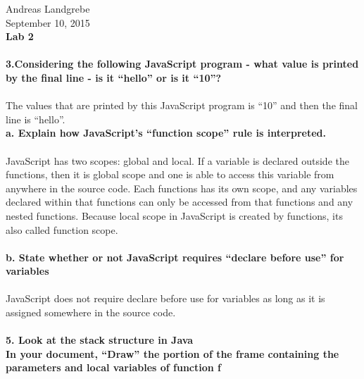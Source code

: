\documentclass{article}
\begin{document}
\noindent
Andreas Landgrebe
\\
September 10, 2015
\\
\textbf{Lab 2}
\\
\\
\textbf{3.Considering the following JavaScript program - what value is printed by the final line - is it ``hello'' or is it ``10''?}
\\
\\

The values that are printed by this JavaScript program is ``10'' and then the final line is ``hello''.
\\
\textbf{a. Explain how JavaScript's ``function scope'' rule is interpreted.}
\\
\\
JavaScript has two scopes: global and local. If a variable is declared outside the functions, then it is global scope and one is able to access this variable from anywhere in the source code. Each functions has its own scope, and any variables declared within that functions can only be accessed from that functions and any nested functions. Because local scope in JavaScript is created by functions, its also called function scope.
\\
\\
\textbf{b. State whether or not JavaScript requires ``declare before use'' for variables}
\\
\\
JavaScript does not require declare before use for variables as long as it is assigned somewhere in the source code.
\\
\\
\textbf{5. Look at the stack structure in Java}
\\
\textbf{In your document, ``Draw'' the portion of the frame containing the parameters and local variables of function f}
\\
\\
\end{document}
